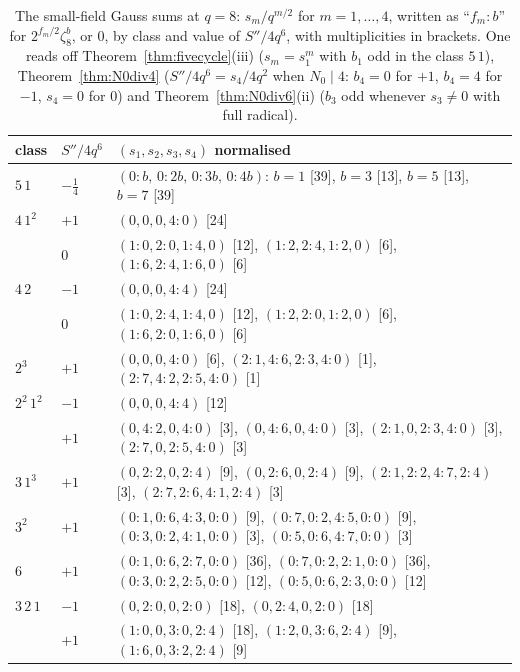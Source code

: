 ﻿\documentclass[12pt,a4paper]{amsart}
\theoremstyle{definition}
\newcommand{\Spp}{S''}
\begin{document}
\begin{table}[H]
\centering
\caption{The small-field Gauss sums at $q=8$: $s_m/q^{m/2}$ for $m=1,\dots,4$, written as ``$f_m{:}b$'' for $2^{f_m/2}\zeta_8^{b}$, or $0$, by class and value of $\Spp/4q^6$, with multiplicities in brackets. One reads off Theorem~\ref{thm:fivecycle}(iii) ($s_m=s_1^m$ with $b_1$ odd in the class $5\,1$), Theorem~\ref{thm:N0div4} ($\Spp/4q^6=s_4/4q^2$ when $N_0\mid4$: $b_4=0$ for $+1$, $b_4=4$ for $-1$, $s_4=0$ for $0$) and Theorem~\ref{thm:N0div6}(ii) ($b_3$ odd whenever $s_3\ne0$ with full radical).}\label{tab:smallgauss}
\scriptsize
\begin{tabular}{@{}lll@{}}
\toprule
class & $\Spp/4q^6$ & $(s_1,s_2,s_3,s_4)$ normalised\\
\midrule
$5\,1$ & $-\tfrac14$ & $(0{:}b,\,0{:}2b,\,0{:}3b,\,0{:}4b)$: $b=1$ [39], $b=3$ [13], $b=5$ [13], $b=7$ [39]\\
$4\,1^2$ & $+1$ & $(0,0,0,4{:}0)$ [24]\\
 & $0$ & $(1{:}0,2{:}0,1{:}4,0)$ [12], $(1{:}2,2{:}4,1{:}2,0)$ [6], $(1{:}6,2{:}4,1{:}6,0)$ [6]\\
$4\,2$ & $-1$ & $(0,0,0,4{:}4)$ [24]\\
 & $0$ & $(1{:}0,2{:}4,1{:}4,0)$ [12], $(1{:}2,2{:}0,1{:}2,0)$ [6], $(1{:}6,2{:}0,1{:}6,0)$ [6]\\
$2^3$ & $+1$ & $(0,0,0,4{:}0)$ [6], $(2{:}1,4{:}6,2{:}3,4{:}0)$ [1], $(2{:}7,4{:}2,2{:}5,4{:}0)$ [1]\\
$2^2\,1^2$ & $-1$ & $(0,0,0,4{:}4)$ [12]\\
 & $+1$ & $(0,4{:}2,0,4{:}0)$ [3], $(0,4{:}6,0,4{:}0)$ [3], $(2{:}1,0,2{:}3,4{:}0)$ [3], $(2{:}7,0,2{:}5,4{:}0)$ [3]\\
$3\,1^3$ & $+1$ & $(0,2{:}2,0,2{:}4)$ [9], $(0,2{:}6,0,2{:}4)$ [9], $(2{:}1,2{:}2,4{:}7,2{:}4)$ [3], $(2{:}7,2{:}6,4{:}1,2{:}4)$ [3]\\
$3^2$ & $+1$ & $(0{:}1,0{:}6,4{:}3,0{:}0)$ [9], $(0{:}7,0{:}2,4{:}5,0{:}0)$ [9], $(0{:}3,0{:}2,4{:}1,0{:}0)$ [3], $(0{:}5,0{:}6,4{:}7,0{:}0)$ [3]\\
$6$ & $+1$ & $(0{:}1,0{:}6,2{:}7,0{:}0)$ [36], $(0{:}7,0{:}2,2{:}1,0{:}0)$ [36], $(0{:}3,0{:}2,2{:}5,0{:}0)$ [12], $(0{:}5,0{:}6,2{:}3,0{:}0)$ [12]\\
$3\,2\,1$ & $-1$ & $(0,2{:}0,0,2{:}0)$ [18], $(0,2{:}4,0,2{:}0)$ [18]\\
 & $+1$ & $(1{:}0,0,3{:}0,2{:}4)$ [18], $(1{:}2,0,3{:}6,2{:}4)$ [9], $(1{:}6,0,3{:}2,2{:}4)$ [9]\\
\bottomrule
\end{tabular}
\end{table}
\end{document}
